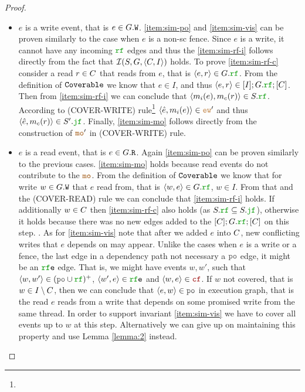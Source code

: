 \documentclass[12pt]{article}
\begin{document}
\begin{proof}
\begin{itemize}
    \item $e$ is a write event, that is $e \in G.{\mathtt{W}}$.
      \ref{item:sim-po} and \ref{item:sim-vis} can be proven similarly 
      to the case when $e$ is a non-sc fence.
      Since $e$ is a write, it cannot have any incoming $\lRF$ edges and thus
      the \ref{item:sim-rf-i} follows directly from 
      the fact that $\mathcal{I}(S, G, \langle C, I \rangle)$ holds.
      To prove \ref{item:sim-rf-c} consider a read $r \in C$ that reads from $e$,
      that is $\tup{e, r} \in \lG.\lRF$.
      From the definition of ${\mathtt{Coverable}}$ we know that $e \in I$,
      and thus $\tup{e, r} \in [\lI];\lG.\lRF;[\lC]$.
      Then from \ref{item:sim-rf-i} we can conclude that $\tup{\lMI(e), \lMC(r)} \in \lES.\lRF$.
      According to (COVER-WRITE) rule\footnote{}
      $\tup{\hat{e}, \lMI(e)} \in \lEW'$
      and thus $\tup{\hat{e}, \lMC(r)} \in \lES'.\lJF$.
      Finally, \ref{item:sim-mo} follows directly from the
      construction of $\lMO'$ in (COVER-WRITE) rule.
      
    \item $e$ is a read event, that is $e \in G.{\mathtt{R}}$.
      Again \ref{item:sim-po} can be proven similarly to the previous cases.
      \ref{item:sim-mo} holds because read events do not contribute to the $\lMO$.
      From the definition of ${\mathtt{Coverable}}$ we know that for write $w \in G.{\mathtt{W}}$
      that $e$ read from, that is $\tup{w, e} \in \lG.\lRF$, $w \in I$.
      From that and the (COVER-READ) rule we can conclude that \ref{item:sim-rf-i} holds.
      If additionally $w \in C$ then \ref{item:sim-rf-c} also holds
      (as $\lES.\lRF \subseteq \lES.\lJF$),
      otherwise it holds because there was no new edges
      added to the $[\lC];\lG.\lRF;[\lC]$ on this step.
      .
      As for \ref{item:sim-vis} note that after we added $e$ into $C$,
      new conflicting writes that $e$ depends on may appear.
      Unlike the cases when $e$ is a write or a fence,
      the last edge in a dependency path not necessary a $\lPO$ edge,
      it might be an $\lRFE$ edge.
      That is, we might have events $w, w'$, such that
      $\tup{w, w'} \in (\lPO \cup \lRF)^+$,
      $\tup{w', e} \in \lRFE$ and $\tup{w, e} \in \lCF$.
      If $w$ not covered, that is $w \in I \setminus C$,
      then we can conclude that $\tup{e, w} \in \lPO$ in execution graph,
      that is the read $e$ reads from a write that depends on some promised write
      from the same thread.
      In order to support invariant \ref{item:sim-vis} we have to
      cover all events up to $w$ at this step.
      Alternatively we can give up on maintaining this property
      and use Lemma \ref{lemma:2} instead.


  \end{itemize}
\end{proof}
\end{document}

